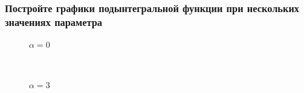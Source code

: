 \documentclass{article}
\begin{document}
\subsubsection{Постройте графики подынтегральной функции при нескольких значениях параметра}
\begin{figure}[h!]
\caption*{$ \alpha = 0 $}
\end{figure}\\
\begin{figure}[h!]
\caption*{$ \alpha = 3 $}
\end{figure}\\\\\\\\\\
\end{document}
